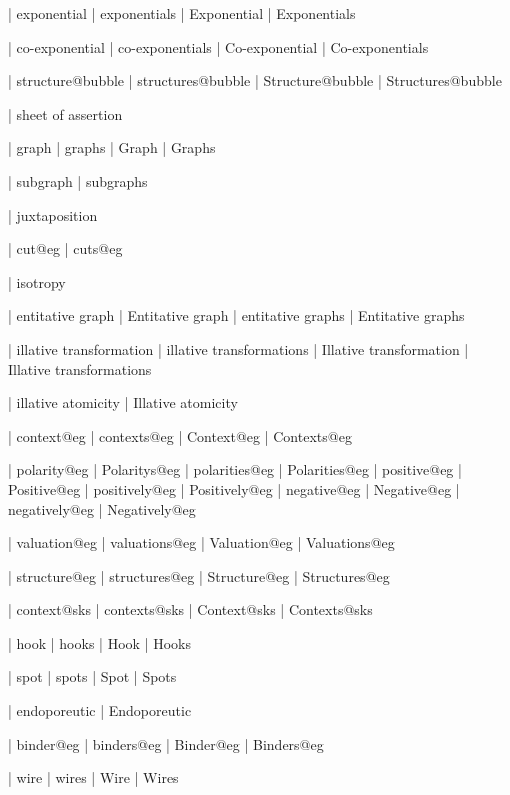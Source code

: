  | exponential
 | exponentials
 | Exponential
 | Exponentials

 | co-exponential
 | co-exponentials
 | Co-exponential
 | Co-exponentials

 | structure@bubble
 | structures@bubble
 | Structure@bubble
 | Structures@bubble


 | sheet of assertion
 
 | graph
 | graphs
 | Graph
 | Graphs

 | subgraph
 | subgraphs

 | juxtaposition

 | cut@eg
 | cuts@eg

 | isotropy

 | entitative graph
 | Entitative graph
 | entitative graphs
 | Entitative graphs

 | illative transformation
 | illative transformations
 | Illative transformation
 | Illative transformations

 | illative atomicity
 | Illative atomicity
 
 | context@eg
 | contexts@eg
 | Context@eg
 | Contexts@eg

 | polarity@eg
 | Polaritys@eg
 | polarities@eg
 | Polarities@eg
 | positive@eg
 | Positive@eg
 | positively@eg
 | Positively@eg
 | negative@eg
 | Negative@eg
 | negatively@eg
 | Negatively@eg

 | valuation@eg
 | valuations@eg
 | Valuation@eg
 | Valuations@eg

 | structure@eg
 | structures@eg
 | Structure@eg
 | Structures@eg

 | context@sks
 | contexts@sks
 | Context@sks
 | Contexts@sks

 | hook
 | hooks
 | Hook
 | Hooks

 | spot
 | spots
 | Spot
 | Spots
 
 | endoporeutic
 | Endoporeutic

 | binder@eg
 | binders@eg
 | Binder@eg
 | Binders@eg

 | wire
 | wires
 | Wire
 | Wires

